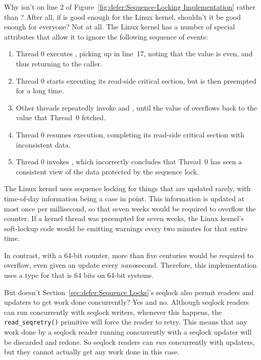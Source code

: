 \begin{enumerate}
\QuickQ{}
	Why isn't  on line 2 of
	Figure~\ref{fig:defer:Sequence-Locking Implementation}
	 rather than ?
	After all, if  is good enough for the Linux
	kernel, shouldn't it be good enough for everyone?
\QuickA{}
	Not at all.
	The Linux kernel has a number of special attributes that allow
	it to ignore the following sequence of events:
	\begin{enumerate}
	\item	Thread 0 executes , picking up
		 in line~17, noting that the value is even,
		and thus returning to the caller.
	\item	Thread 0 starts executing its read-side critical section,
		but is then preempted for a long time.
	\item	Other threads repeatedly invoke  and
		, until the value of 
		overflows back to the value that Thread~0 fetched.
	\item	Thread 0 resumes execution, completing its read-side
		critical section with inconsistent data.
	\item	Thread 0 invokes , which incorrectly
		concludes that Thread~0 has seen a consistent view of
		the data protected by the sequence lock.
	\end{enumerate}

	The Linux kernel uses sequence locking for things that are
	updated rarely, with time-of-day information being a case
	in point.
	This information is updated at most once per millisecond,
	so that seven weeks would be required to overflow the counter.
	If a kernel thread was preempted for seven weeks, the Linux
	kernel's soft-lockup code would be emitting warnings every two
	minutes for that entire time.

	In contrast, with a 64-bit counter, more than five centuries
	would be required to overflow, even given an update every
	\emph{nano}second.
	Therefore, this implementation uses a type for 
	that is 64 bits on 64-bit systems.

\QuickQ{}
	But doesn't Section~\ref{sec:defer:Sequence Locks}'s seqlock
	also permit readers and updaters to get work done concurrently?
\QuickA{}
	Yes and no.
	Although seqlock readers can run concurrently with
	seqlock writers, whenever this happens, the {\tt read\_seqretry()}
	primitive will force the reader to retry.
	This means that any work done by a seqlock reader running concurrently
	with a seqlock updater will be discarded and redone.
	So seqlock readers can \emph{run} concurrently with updaters,
	but they cannot actually get any work done in this case.


\end{enumerate}

